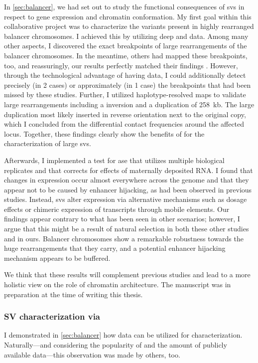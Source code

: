 In \cref{sec:balancer}, we had set out to study the functional consequences of
\acp{sv} in respect to gene expression and chromatin conformation. My first goal
within this collaborative project was to characterize the variants present in
highly rearranged balancer chromosomes. I achieved this by utilizing deep \wgs
and \hic data. Among many other aspects, I discovered the exact breakpoints of
large rearrangements of the balancer chromosomes. In the meantime, others had
mapped these breakpoints, too, and reassuringly, our results perfectly matched
their findings \citep{Miller2016,Miller2018}. However, through the technological
advantage of having \hic data, I could additionally detect precisely (in 2
cases) or approximately (in 1 case) the breakpoints that had been missed by
these studies. Further, I utilized haplotype-resolved \hic maps to validate
large rearrangements including a inversion and a duplication of 258~kb. The
large duplication most likely inserted in reverse orientation next to the
original copy, which I concluded from the differential contact frequencies
around the affected locus. Together, these findings clearly show the benefits
of \hic for the characterization of large \acp{sv}.

Afterwards, I implemented a
test for \acl{ase} that utilizes multiple biological replicates and that
corrects for effects of maternally deposited RNA. I found that changes in
expression occur almost everywhere across the genome and that they appear not to
be caused by enhancer hijacking, as had been observed in previous studies.
Instead, \acp{sv} alter expression via alternative mechanisms such as dosage
effects or chimeric expression of transcripts through mobile elements. Our
findings appear contrary to what has been seen in other scenarios; however, I
argue that this might be a result of natural selection in both these other
studies and in ours. Balancer chromosomes show a remarkable robustness towards
the huge rearrangements that they carry, and a potential enhancer hijacking
mechanism appears to be buffered.

We think that these results will complement
previous studies and lead to a more holistic view on the role of chromatin
architecture. The manuscript was in preparation at the time of writing this
thesis.





\subsubsection{SV characterization via \hic}
I demonstrated in \cref{sec:balancer} how \hic data can be utilized for \sv
characterization. Naturally---and considering the popularity of \hic and the
amount of publicly available data---this observation was made by others, too.


